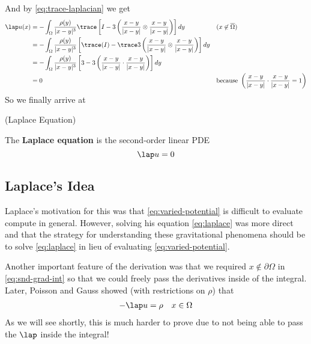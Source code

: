 \documentclass{bkcnotes}
\begin{document}
And by \eqref{eq:trace-laplacian} we get
\begin{equation}
  \label{eq:laplace-u}
  \begin{aligned}
    \lap u(x) &= -\int_{\Omega}\frac{\rho(y)}{|x-y|^3}\trace \left[ I
      - 3\left(\frac{x-y}{|x-y|} \otimes
        \frac{x-y}{|x-y|}\right)\right]dy
    && (x \not\in\overline{\Omega}) \\
    &= -\int_{\Omega}\frac{\rho(y)}{|x-y|^3}\left[\trace(I) - \trace
      3\left(\frac{x-y}{|x-y|} \otimes
        \frac{x-y}{|x-y|}\right)\right]dy \\
    &= -\int_{\Omega}\frac{\rho(y)}{|x-y|^3}\left[3 - 3
      \left(\frac{x-y}{|x-y|} \cdot
        \frac{x-y}{|x-y|}\right)\right]dy \\
    &= 0 && \text{because }\left(\frac{x-y}{|x-y|} \cdot
      \frac{x-y}{|x-y|} = 1\right)
  \end{aligned}
\end{equation}
So we finally arrive at
\begin{ndefn}(Laplace Equation)

  The \textbf{Laplace equation} is the second-order linear PDE
  \begin{equation}
    \label{eq:laplace}
    \lap u = 0
  \end{equation}
\end{ndefn}

\subsection{Laplace's Idea}

Laplace's motivation for this was that \eqref{eq:varied-potential} is
difficult to evaluate compute in general. However, solving his
equation \eqref{eq:laplace} was more direct and that the strategy for
understanding these gravitational phenomena should be to solve
\eqref{eq:laplace} in lieu of evaluating \eqref{eq:varied-potential}.

Another important feature of the derivation was that we required
$x\not\in\partial\Omega$ in \eqref{eq:snd-grad-int} so that we could
freely pass the derivatives inside of the integral. Later, Poisson and
Gauss showed (with restrictions on $\rho$) that
\begin{equation}
  \label{eq:poisson}
  \begin{aligned}
    -\lap u = \rho && x \in \Omega
  \end{aligned}
\end{equation}
As we will see shortly, this is much harder to prove due to not being
able to pass the $\lap$ inside the integral!
\end{document}
